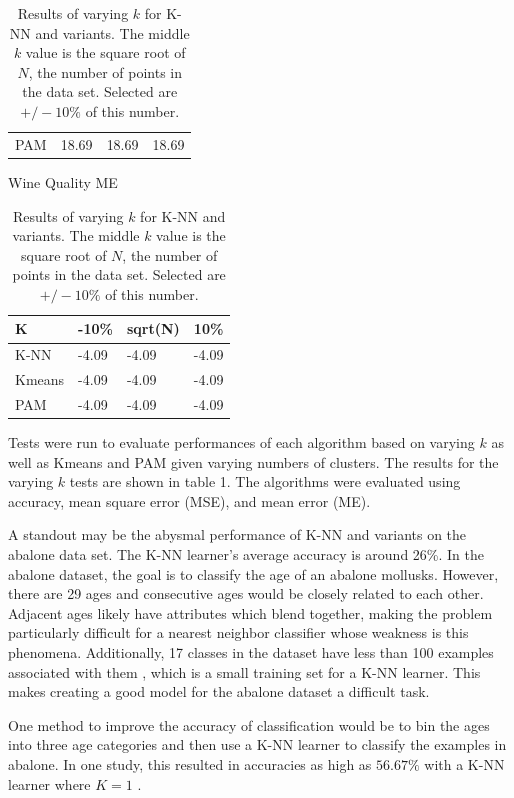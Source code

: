\documentclass[twoside,11pt]{article}
\begin{document}
\begin{table}[h]
\begin{minipage}[b]{0.45\linewidth}
\begin{tabular}{llll}
			PAM    & 18.69 & 18.69   & 18.69
		\end{tabular}
	\end{minipage}
	\hspace{0.5cm}\centering
	\centering
	\begin{minipage}[b]{0.45\linewidth}
		Wine Quality ME
		\centering
		\begin{tabular}{llll}
			\hline
			K      & -10\% & sqrt(N) & 10\%  \\ \hline
			K-NN   & -4.09 & -4.09   & -4.09 \\
			Kmeans & -4.09 & -4.09   & -4.09 \\
			PAM    & -4.09 & -4.09   & -4.09
		\end{tabular}
	\end{minipage}
	\caption{Results of varying $k$ for K-NN and variants. The middle $k$ value is the square root of $N$, the number of points in the data set. Selected are $+/- 10\%$ of this number.}
\end{table}

Tests were run to evaluate performances of each algorithm based on varying $k$ as well as Kmeans and PAM given varying numbers of clusters. The results for the varying $k$ tests are shown in table 1. The algorithms were evaluated using accuracy, mean square error (MSE), and mean error (ME).

A standout may be the abysmal performance of K-NN and variants on the abalone data set. The K-NN learner's average accuracy is around 26\%. In the abalone dataset, the goal is to classify the age of an abalone mollusks. However, there are 29 ages and consecutive ages would be closely related to each other. Adjacent ages likely have attributes which blend together, making the problem particularly difficult for a nearest neighbor classifier whose weakness is this phenomena. 
Additionally, 17 classes in the dataset have less than 100 examples associated with them \citep{datasets}, which is a small training set for a K-NN learner.
This makes creating a good model for the abalone dataset a difficult task.

One method to improve the accuracy of classification would be to bin the ages into three age categories and then use a K-NN learner to classify the examples in abalone. In one study, this resulted in accuracies as high as $56.67\%$ with a K-NN learner where $K = 1$ \citep{abalone-bad}.
\end{document}
